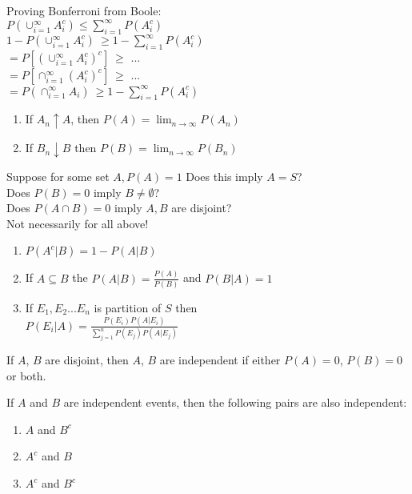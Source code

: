 \documentclass[14pt, oneside, letterpaper]{notes}
\begin{document}
\begin{remark}
	Proving Bonferroni from Boole: \\
	$P(\cup_{i=1}^{\infty} A_i^c) 
	\leq \sum_{i=1}^{\infty} P(A_i^c)$ \\
	$1- P(\cup_{i=1}^{\infty} A_i^c) \:  
	\geq 1 - \sum_{i=1}^{\infty} P(A_i^c)$ \\
	$ = P[(\cup_{i=1}^{\infty} A_i^c)^c] \: 
	\geq$ ...  \\
	$ = P[\cap_{i=1}^{\infty} (A_i^c)^c] \: 
	\geq$ ... \\
	$ = P(\cap_{i=1}^{\infty} A_i ) \: 
	\geq 1- \sum_{i=1}^{\infty} P(A_i^c)$ 
\end{remark}

\begin{enumerate}
	\item If $A_n \uparrow A$, then $P(A) = \lim_{n \to \infty} P(A_n)$ 

	\item If $B_n \downarrow B$ then $P(B) = \lim_{n \to \infty} P(B_n)$ 
\end{enumerate}

%
%

\begin{remark}
	Suppose for some set $A, P(A) = 1$ Does this imply $A=S$? \\
	Does $P(B) = 0$ imply $B \neq \emptyset$? \\
	Does $P(A \cap B) = 0$ imply $A,B$ are disjoint? \\
	Not necessarily for all above! 
\end{remark}

%
%


\begin{enumerate}
\item $P(A^c|B) = 1 - P(A|B)$
\item If $A \subseteq B$ the $P(A|B) = \frac{P(A)}{P(B)}$
	and $P(B|A) = 1$
\item If ${E_1, E_2 ... E_n}$ is partition of $S$ then \\
	$P(E_i|A) = \frac{P(E_i)P(A|E_i)}
	{\sum_{j=1}^{n}P(E_j)P(A|E_j)}$
\end{enumerate}

\begin{remark}
	If $A$, $B$ are disjoint, then $A$, $B$ are independent if
	either $P(A)=0$, $P(B)=0$ or both.
\end{remark}

\begin{remark}
	If $A$ and $B$ are independent events, then the 
	following pairs are also independent:
	\begin{enumerate}
		\item $A$ and $B^c$
		\item $A^c$ and $B$
		\item $A^c$ and $B^c$
	\end{enumerate}
\end{remark}
\end{document}
